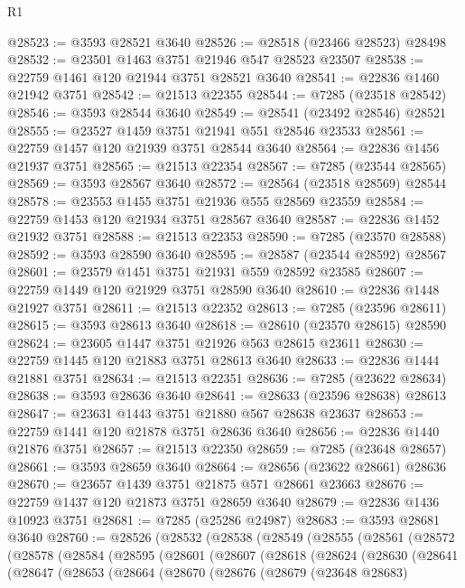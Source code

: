 \begin{lexlean}{R1}
\begin{coremodule}
@28523 := @3593 @28521 @3640
@28526 := @28518 (@23466 @28523) @28498
@28532 := @23501 @1463 @3751 @21946 @547 @28523 @23507
@28538 := @22759 @1461 @120 @21944 @3751 @28521 @3640
@28541 := @22836 @1460 @21942 @3751
@28542 := @21513 @22355
@28544 := @7285 (@23518 @28542)
@28546 := @3593 @28544 @3640
@28549 := @28541 (@23492 @28546) @28521
@28555 := @23527 @1459 @3751 @21941 @551 @28546 @23533
@28561 := @22759 @1457 @120 @21939 @3751 @28544 @3640
@28564 := @22836 @1456 @21937 @3751
@28565 := @21513 @22354
@28567 := @7285 (@23544 @28565)
@28569 := @3593 @28567 @3640
@28572 := @28564 (@23518 @28569) @28544
@28578 := @23553 @1455 @3751 @21936 @555 @28569 @23559
@28584 := @22759 @1453 @120 @21934 @3751 @28567 @3640
@28587 := @22836 @1452 @21932 @3751
@28588 := @21513 @22353
@28590 := @7285 (@23570 @28588)
@28592 := @3593 @28590 @3640
@28595 := @28587 (@23544 @28592) @28567
@28601 := @23579 @1451 @3751 @21931 @559 @28592 @23585
@28607 := @22759 @1449 @120 @21929 @3751 @28590 @3640
@28610 := @22836 @1448 @21927 @3751
@28611 := @21513 @22352
@28613 := @7285 (@23596 @28611)
@28615 := @3593 @28613 @3640
@28618 := @28610 (@23570 @28615) @28590
@28624 := @23605 @1447 @3751 @21926 @563 @28615 @23611
@28630 := @22759 @1445 @120 @21883 @3751 @28613 @3640
@28633 := @22836 @1444 @21881 @3751
@28634 := @21513 @22351
@28636 := @7285 (@23622 @28634)
@28638 := @3593 @28636 @3640
@28641 := @28633 (@23596 @28638) @28613
@28647 := @23631 @1443 @3751 @21880 @567 @28638 @23637
@28653 := @22759 @1441 @120 @21878 @3751 @28636 @3640
@28656 := @22836 @1440 @21876 @3751
@28657 := @21513 @22350
@28659 := @7285 (@23648 @28657)
@28661 := @3593 @28659 @3640
@28664 := @28656 (@23622 @28661) @28636
@28670 := @23657 @1439 @3751 @21875 @571 @28661 @23663
@28676 := @22759 @1437 @120 @21873 @3751 @28659 @3640
@28679 := @22836 @1436 @10923 @3751
@28681 := @7285 (@25286 @24987)
@28683 := @3593 @28681 @3640
@28760 := @28526
    (@28532
      (@28538
        (@28549
          (@28555
            (@28561
              (@28572
                (@28578
                  (@28584
                    (@28595
                      (@28601
                        (@28607
                          (@28618
                            (@28624
                              (@28630
                                (@28641
                                  (@28647
                                    (@28653
                                      (@28664
                                        (@28670
                                          (@28676
                                            (@28679
                                              (@23648 @28683)

\end{coremodule}
\end{lexlean}
